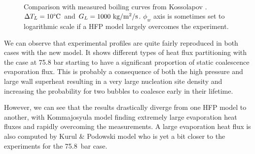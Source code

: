 \begin{figure}[!h]
{}
\\
\caption{Comparison with measured boiling curves from Kossolapov \cite{kossolapov_experimental_2021}. $\Delta T_{L}=10\degree\mathrm{C}$ and $G_{L}=1000~\text{kg/m$^{2}$/s}$. $\phi_{w}$ axis is sometimes set to logarithmic scale if a HFP model largely overcomes the experiment.}
\label{fig:HFP_koss_BC}
\end{figure}


\clearpage

We can observe that experimental profiles are quite fairly reproduced in both cases with the new model. It shows different types of heat flux partitioning with the case at 75.8 bar starting to have a significant proportion of static coalescence evaporation flux. This is probably a consequence of both the high pressure and large wall superheat resulting in a very large nucleation site density and increasing the probability for two bubbles to coalesce early in their lifetime.

However, we can see that the results drastically diverge from one HFP model to another, with Kommajosyula model finding extremely large evaporation heat fluxes and rapidly overcoming the measurements. A large evaporation heat flux is also computed by Kurul \& Podowski model who is yet a bit closer to the experiments for the 75.8\ bar case.

